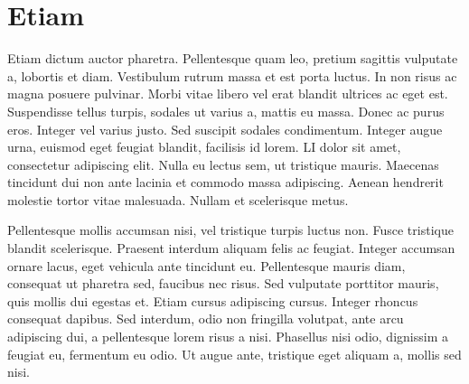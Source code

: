 \documentclass[final,los,index,glossary,loa]{ryethesis}
\begin{document}
\section{Etiam}
Etiam dictum auctor pharetra. Pellentesque quam leo, pretium sagittis vulputate a, lobortis et diam. Vestibulum rutrum massa et est porta luctus. In non risus ac magna posuere pulvinar. Morbi vitae libero vel erat blandit ultrices ac eget est. Suspendisse tellus turpis, sodales ut varius a, mattis eu massa. Donec ac purus eros. Integer vel varius justo. Sed suscipit sodales condimentum. Integer augue urna, euismod eget feugiat blandit, facilisis id lorem. \Gls{LI} dolor sit amet, consectetur adipiscing elit. Nulla eu lectus sem, ut tristique mauris. Maecenas tincidunt dui non ante lacinia et commodo massa adipiscing. Aenean hendrerit molestie tortor vitae malesuada. Nullam et scelerisque metus.

Pellentesque mollis accumsan nisi, vel tristique turpis luctus non. Fusce tristique blandit scelerisque. Praesent interdum aliquam felis ac feugiat. Integer accumsan ornare lacus, eget vehicula ante tincidunt eu. Pellentesque mauris diam, consequat ut pharetra sed, faucibus nec risus. Sed vulputate porttitor mauris, quis mollis dui egestas et. Etiam cursus adipiscing cursus. Integer rhoncus consequat dapibus. Sed interdum, odio non fringilla volutpat, ante arcu adipiscing dui, a pellentesque lorem risus a nisi. Phasellus nisi odio, dignissim a feugiat eu, fermentum eu odio. Ut augue ante, tristique eget aliquam a, mollis sed nisi.

\end{document}
